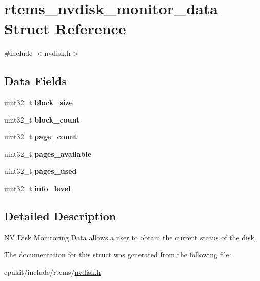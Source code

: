 \hypertarget{structrtems__nvdisk__monitor__data}{}\section{rtems\+\_\+nvdisk\+\_\+monitor\+\_\+data Struct Reference}
\label{structrtems__nvdisk__monitor__data}


{\ttfamily \#include $<$nvdisk.\+h$>$}

\subsection*{Data Fields}
\begin{DoxyCompactItemize}
\item 
\mbox{\label{structrtems__nvdisk__monitor__data_aaf56de936bc465520d4add42023d1dd7}} 
uint32\+\_\+t {\bfseries block\+\_\+size}
\item 
\mbox{\label{structrtems__nvdisk__monitor__data_a4b6f04d885f2f1d8579de6364d1aae4d}} 
uint32\+\_\+t {\bfseries block\+\_\+count}
\item 
\mbox{\label{structrtems__nvdisk__monitor__data_a741b11fff5168f57244906294c2ba442}} 
uint32\+\_\+t {\bfseries page\+\_\+count}
\item 
\mbox{\label{structrtems__nvdisk__monitor__data_a6ce0bd532340ec078ec4e1dbf7061ab0}} 
uint32\+\_\+t {\bfseries pages\+\_\+available}
\item 
\mbox{\label{structrtems__nvdisk__monitor__data_a4d269123b84e3e5d0846e9078a55f05e}} 
uint32\+\_\+t {\bfseries pages\+\_\+used}
\item 
\mbox{\label{structrtems__nvdisk__monitor__data_aa8ba35ce47cea9cd43a01d658182d7dc}} 
uint32\+\_\+t {\bfseries info\+\_\+level}
\end{DoxyCompactItemize}


\subsection{Detailed Description}
NV Disk Monitoring Data allows a user to obtain the current status of the disk. 

The documentation for this struct was generated from the following file\+:\begin{DoxyCompactItemize}
\item 
cpukit/include/rtems/\mbox{\hyperlink{nvdisk_8h}{nvdisk.\+h}}\end{DoxyCompactItemize}
